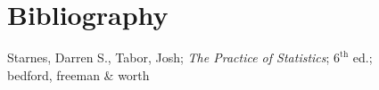 \section{Bibliography}

\begin{thebibliography}{9}
Starnes, Darren S., Tabor, Josh; \textit{The Practice of Statistics}; $6^{\text{th}}$ ed.;\\ bedford, freeman \& worth

\end{thebibliography}